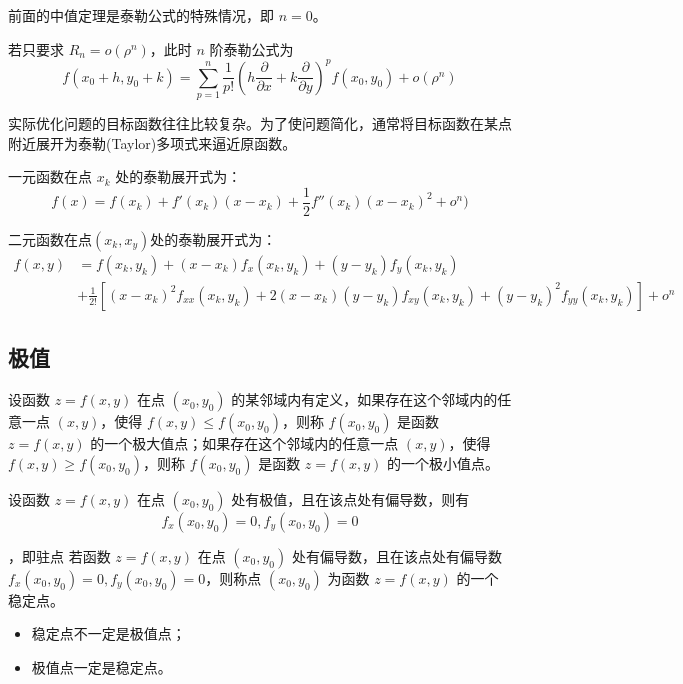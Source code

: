 前面的中值定理是泰勒公式的特殊情况，即 $n=0$。

若只要求 $R_n=o(\rho^n)$，此时 $n$ 阶泰勒公式为
\[
    f(x_0+h,y_0+k)=\sum_{p=1}^n\frac{1}{p!}(h\frac{\partial}{\partial x}+k\frac{\partial}{\partial y})^pf(x_0,y_0)+o(\rho^n)
\]

实际优化问题的目标函数往往比较复杂。为了使问题简化，通常将目标函数在某点附近展开为泰勒(Taylor)多项式来逼近原函数。

一元函数在点 $x_k$ 处的泰勒展开式为：
\[
    f(x)=f(x_k)+f'(x_k)(x-x_k)+\frac{1}{2}f''(x_k)(x-x_k)^2+o^n)
\]

二元函数在点$(x_k,x_y)$处的泰勒展开式为：
\[
    \begin{aligned}
        f(x,y) & =f(x_k,y_k)+(x-x_k)f_x(x_k,y_k)+(y-y_k)f_y(x_k,y_k)                                                 \\
               & +\frac{1}{2!}[(x-x_k)^2f_{xx}(x_k,y_k)+2(x-x_k)(y-y_k)f_{xy}(x_k,y_k)+(y-y_k)^2f_{yy}(x_k,y_k)]+o^n
    \end{aligned}
\]

\subsection{极值}

\begin{definition}
    设函数 $z=f(x,y)$ 在点 $(x_0,y_0)$ 的某邻域内有定义，如果存在这个邻域内的任意一点 $(x,y)$，使得 $f(x,y)\leq f(x_0,y_0)$，则称 $f(x_0,y_0)$ 是函数 $z=f(x,y)$ 的一个极大值点；如果存在这个邻域内的任意一点 $(x,y)$，使得 $f(x,y)\geq f(x_0,y_0)$，则称 $f(x_0,y_0)$ 是函数 $z=f(x,y)$ 的一个极小值点。
\end{definition}

\begin{theorem}[极值的必要条件]
    设函数 $z=f(x,y)$ 在点 $(x_0,y_0)$ 处有极值，且在该点处有偏导数，则有
    \[
        f_x(x_0,y_0)=0,f_y(x_0,y_0)=0
    \]
\end{theorem}

\begin{definition}[稳定点]，即驻点
    若函数 $z=f(x,y)$ 在点 $(x_0,y_0)$ 处有偏导数，且在该点处有偏导数 $f_x(x_0,y_0)=0,f_y(x_0,y_0)=0$，则称点 $(x_0,y_0)$ 为函数 $z=f(x,y)$ 的一个稳定点。
\end{definition}

\begin{itemize}
    \item 稳定点不一定是极值点；
    \item 极值点一定是稳定点。
\end{itemize}

